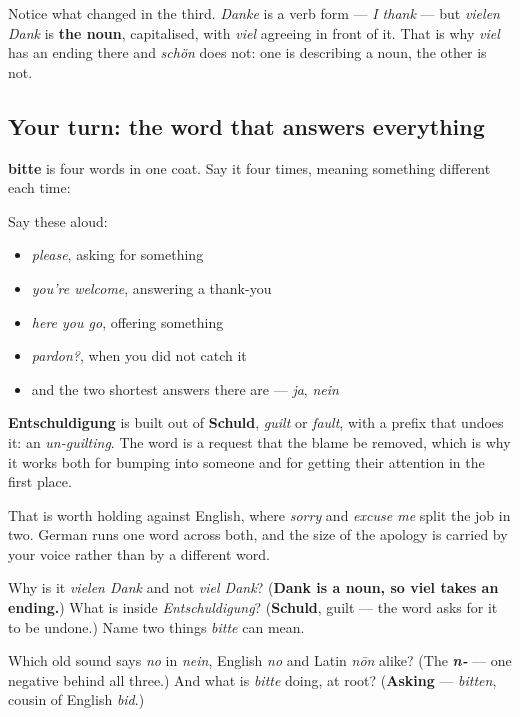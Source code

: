 Notice what changed in the third. \emph{Danke} is a verb form — \emph{I thank} — but \emph{vielen Dank} is \textbf{the noun}, capitalised, with \emph{viel} agreeing in front of it. That is why \emph{viel} has an ending there and \emph{schön} does not: one is describing a noun, the other is not.

\subsection*{Your turn: the word that answers everything}
\textbf{bitte} is four words in one coat. Say it four times, meaning something different each time:

Say these aloud:

\begin{itemize}
\raggedright
  \item \emph{please}, asking for something
  \item \emph{you're welcome}, answering a thank-you
  \item \emph{here you go}, offering something
  \item \emph{pardon?}, when you did not catch it
  \item and the two shortest answers there are — \emph{ja}, \emph{nein}
\end{itemize}

\begin{culture}
\textbf{Entschuldigung} is built out of \textbf{Schuld}, \emph{guilt} or \emph{fault}, with a prefix that undoes it: an \emph{un-guilting}. The word is a request that the blame be removed, which is why it works both for bumping into someone and for getting their attention in the first place.

That is worth holding against English, where \emph{sorry} and \emph{excuse me} split the job in two. German runs one word across both, and the size of the apology is carried by your voice rather than by a different word.
\end{culture}

\begin{tcolorbox}[breakable,colback=teal!4,colframe=teal!35!black,title={Before you move on}]
Why is it \emph{vielen Dank} and not \emph{viel Dank}? (\textbf{Dank is a noun, so viel takes an ending.}) What is inside \emph{Entschuldigung}? (\textbf{Schuld}, guilt — the word asks for it to be undone.) Name two things \emph{bitte} can mean.

Which old sound says \emph{no} in \emph{nein}, English \emph{no} and Latin \emph{nōn} alike? (The \emph{\textbf{n‑}} — one negative behind all three.) And what is \emph{bitte} doing, at root? (\textbf{Asking} — \emph{bitten}, cousin of English \emph{bid}.)
\end{tcolorbox}
